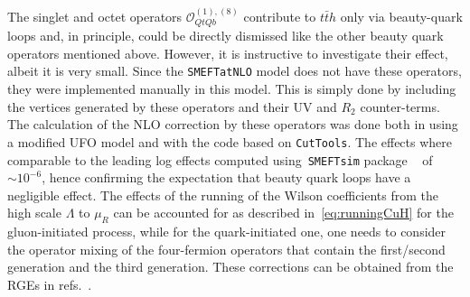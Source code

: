 	\par The singlet and octet operators $\mathcal{O}_{QtQb}^{(1),(8)}$  contribute to $t \bar{t} h$ only via beauty-quark loops and, in principle, could be directly dismissed like the other beauty quark operators mentioned above. However, it is instructive to investigate their effect, albeit it is very small.
	Since the \texttt{SMEFTatNLO} model does not have these operators, they were implemented manually in this model. This is simply done by including the vertices generated by these operators and their UV and $R_2$ counter-terms. The calculation of the NLO correction by these operators was done both in \Madgraph using a modified UFO model and with the code based on \texttt{CutTools}. The effects where comparable to the leading log effects computed using~\texttt{SMEFTsim} package ~\cite{Brivio:2017btx} of $ \sim 10^{-6}$, hence confirming the expectation that beauty quark loops have a negligible effect. 
	The effects of the running of the Wilson coefficients from the high scale $\Lambda$ to $\mu_R$ can be accounted for as described in~\eqref{eq:runningCuH} for the gluon-initiated process, while for the quark-initiated one, one needs to consider the operator mixing of the four-fermion operators that contain the first/second generation and the third generation.
These corrections can be obtained from the RGEs in refs.~\cite{Jenkins:2013zja,Jenkins:2013wua, Alonso:2013hga}.
